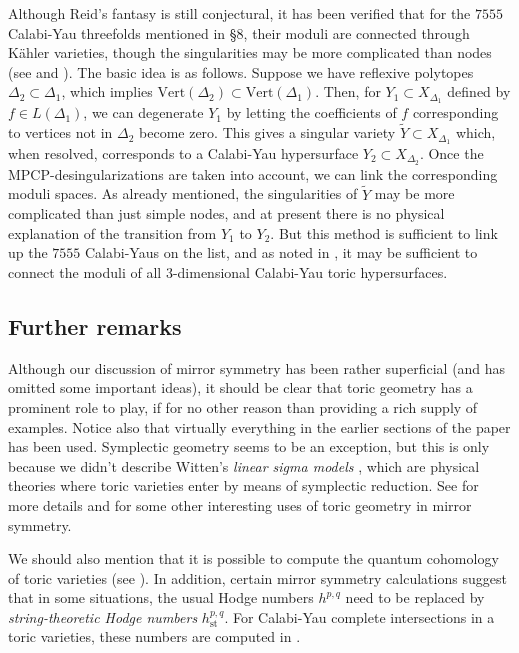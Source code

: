 \documentclass{amsart}
\theoremstyle{plain}
\theoremstyle{definition}
\begin{document}
	Although Reid's fantasy is still conjectural, it has been
verified that for the $7555$ Calabi-Yau threefolds mentioned in \S8,
their moduli are connected through K\"ahler varieties, though the
singularities may be more complicated than nodes (see \cite{ACJM} and
\cite{CGGK}).  The basic idea is as follows.  Suppose we have
reflexive polytopes $\Delta_2 \subset \Delta_1$, which implies
$\mathrm{Vert}(\Delta_2) \subset \mathrm{Vert}(\Delta_1)$.  Then, for
$Y_1 \subset X_{\Delta_1}$ defined by $f \in L(\Delta_1)$, we can
degenerate $Y_1$ by letting the coefficients of $f$ corresponding to
vertices not in $\Delta_2$ become zero.  This gives a singular variety
$\widetilde Y \subset X_{\Delta_1}$ which, when resolved, corresponds
to a Calabi-Yau hypersurface $Y_2 \subset X_{\Delta_2}$.  Once the
MPCP-desingularizations are taken into account, we can link the
corresponding moduli spaces.  As already mentioned, the singularities
of $\widetilde Y$ may be more complicated than just simple nodes, and
at present there is no physical explanation of the transition from
$Y_1$ to $Y_2$.  But this method is sufficient to link up the $7555$
Calabi-Yaus on the list, and as noted in \cite{Ska}, it may be
sufficient to connect the moduli of all $3$-dimensional Calabi-Yau
toric hypersurfaces.

	\subsection{Further remarks} Although our discussion of
mirror symmetry has been rather superficial (and has omitted some
important ideas), it should be clear that toric geometry has a
prominent role to play, if for no other reason than providing a rich
supply of examples.  Notice also that virtually everything in the
earlier sections of the paper has been used.  Symplectic geometry
seems to be an exception, but this is only because we didn't describe
Witten's {\it linear sigma models\/} \cite{Wit}, which are physical
theories where toric varieties enter by means of symplectic reduction.
See \cite{MP} for more details and for some other interesting uses of
toric geometry in mirror symmetry.

	We should also mention that it is possible to compute the
quantum cohomology of toric varieties (see \cite{Bat3}).  In addition,
certain mirror symmetry calculations suggest that in some situations,
the usual Hodge numbers $h^{p,q}$ need to be replaced by {\it
string-theoretic Hodge numbers\/} $h_{\mathrm{st}}^{p,q}$.  For
Calabi-Yau complete intersections in a toric varieties, these numbers
are computed in \cite{BB2}.
\end{document}
